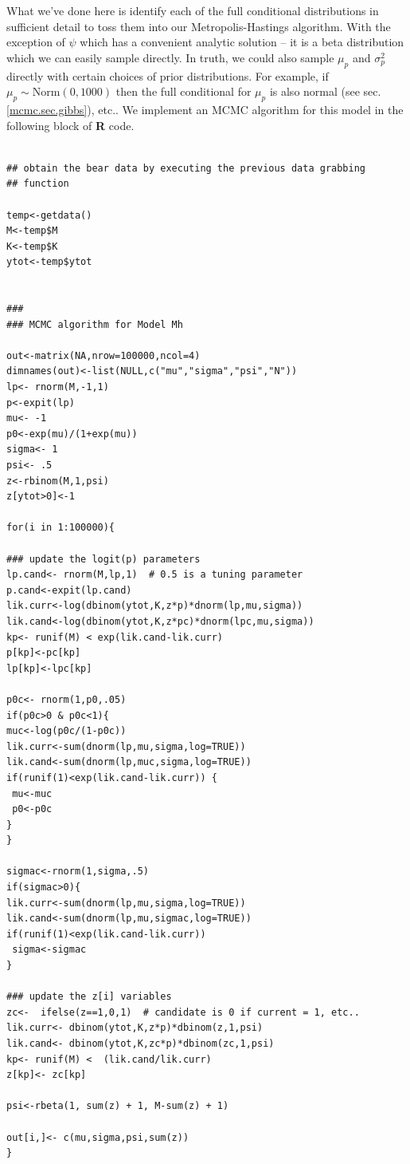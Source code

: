 What we've done here is identify each of the full conditional
distributions in sufficient detail to toss them into our
Metropolis-Hastings algorithm. With the exception of $\psi$ which has
a convenient analytic solution -- it is a beta distribution which we
can easily sample directly. In truth, we could also sample $\mu_{p}$
and $\sigma_{p}^{2}$ directly with certain choices of prior
distributions. For example, if $\mu_{p} \sim \mbox{Norm}(0, 1000)$
then the full conditional for $\mu_{p}$ is also normal (see
sec. \ref{mcmc.sec.gibbs}), etc..
We implement an MCMC algorithm for this model in the following block
of {\bf R} code.  

\begin{verbatim}

## obtain the bear data by executing the previous data grabbing
## function

temp<-getdata()
M<-temp$M
K<-temp$K
ytot<-temp$ytot


###
### MCMC algorithm for Model Mh

out<-matrix(NA,nrow=100000,ncol=4)
dimnames(out)<-list(NULL,c("mu","sigma","psi","N"))
lp<- rnorm(M,-1,1)
p<-expit(lp)
mu<- -1
p0<-exp(mu)/(1+exp(mu))
sigma<- 1
psi<- .5
z<-rbinom(M,1,psi)
z[ytot>0]<-1

for(i in 1:100000){

### update the logit(p) parameters
lp.cand<- rnorm(M,lp,1)  # 0.5 is a tuning parameter
p.cand<-expit(lp.cand)
lik.curr<-log(dbinom(ytot,K,z*p)*dnorm(lp,mu,sigma))
lik.cand<-log(dbinom(ytot,K,z*pc)*dnorm(lpc,mu,sigma))
kp<- runif(M) < exp(lik.cand-lik.curr)
p[kp]<-pc[kp]
lp[kp]<-lpc[kp]

p0c<- rnorm(1,p0,.05)
if(p0c>0 & p0c<1){
muc<-log(p0c/(1-p0c))
lik.curr<-sum(dnorm(lp,mu,sigma,log=TRUE))
lik.cand<-sum(dnorm(lp,muc,sigma,log=TRUE))
if(runif(1)<exp(lik.cand-lik.curr)) {
 mu<-muc
 p0<-p0c
}
}

sigmac<-rnorm(1,sigma,.5)
if(sigmac>0){
lik.curr<-sum(dnorm(lp,mu,sigma,log=TRUE))
lik.cand<-sum(dnorm(lp,mu,sigmac,log=TRUE))
if(runif(1)<exp(lik.cand-lik.curr))
 sigma<-sigmac
}

### update the z[i] variables
zc<-  ifelse(z==1,0,1)  # candidate is 0 if current = 1, etc..
lik.curr<- dbinom(ytot,K,z*p)*dbinom(z,1,psi)
lik.cand<- dbinom(ytot,K,zc*p)*dbinom(zc,1,psi)
kp<- runif(M) <  (lik.cand/lik.curr)
z[kp]<- zc[kp]

psi<-rbeta(1, sum(z) + 1, M-sum(z) + 1)

out[i,]<- c(mu,sigma,psi,sum(z))
}
\end{verbatim}



